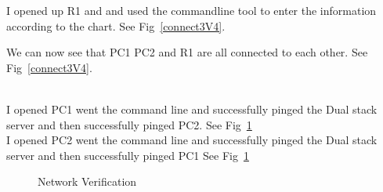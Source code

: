 \documentclass[../EngineeringJournal_CDavis.tex]{subfiles}
\begin{document}
\noindent I opened up R1 and and used the commandline tool to enter the information
according to the chart. See Fig~\ref{connect3V4}.


\noindent We can now see that PC1 PC2 and R1 are all connected to each other. See
Fig~\ref{connect3V4}.

\newpage

\noindent{}\\
I opened PC1 went the command line and successfully pinged the Dual stack server and
then successfully pinged PC2. See Fig~\ref{verify3V4}\\
\noindent I opened PC2 went the command line and successfully pinged the Dual stack server and
then successfully pinged PC1 See Fig~\ref{verify3V4}


\begin{figure}[!hbt]\centering
{}\hfill
{}\par 
\caption{Network Verification}\label{verify3V4}
\end{figure}
\end{document}
